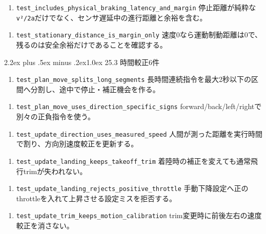 \documentclass[10pt,a4paper,openany]{ltjsbook}
\makeatletter
\renewcommand\section{\@startsection{section}{1}{0pt}%
  {2.2ex plus .5ex minus .2ex}{1.0ex}%
  {\sffamily\Large\bfseries\color{ReportNavy}}}
\makeatother
\begin{document}
\begin{enumerate}
\item \texttt{test\_includes\_physical\_braking\_latency\_and\_margin}  
停止距離が純粋な\texttt{v²/2a}だけでなく、センサ遅延中の進行距離と余裕を含む。\par
\end{enumerate}
\begin{enumerate}
\item \texttt{test\_stationary\_distance\_is\_margin\_only}  
速度0なら運動制動距離は0で、残るのは安全余裕だけであることを確認する。\par
\end{enumerate}
\section{25.3 時間較正6件}
\begin{enumerate}
\item \texttt{test\_plan\_move\_splits\_long\_segments}  
長時間連続指令を最大2秒以下の区間へ分割し、途中で停止・補正機会を作る。\par
\end{enumerate}
\begin{enumerate}
\item \texttt{test\_plan\_move\_uses\_direction\_specific\_signs}  
forward/back/left/rightで別々の正負指令を使う。\par
\end{enumerate}
\begin{enumerate}
\item \texttt{test\_update\_direction\_uses\_measured\_speed}  
人間が測った距離を実行時間で割り、方向別速度較正を更新する。\par
\end{enumerate}
\begin{enumerate}
\item \texttt{test\_update\_landing\_keeps\_takeoff\_trim}  
着陸時の補正を変えても通常飛行trimが失われない。\par
\end{enumerate}
\begin{enumerate}
\item \texttt{test\_update\_landing\_rejects\_positive\_throttle}  
手動下降設定へ正のthrottleを入れて上昇させる設定ミスを拒否する。\par
\end{enumerate}
\begin{enumerate}
\item \texttt{test\_update\_trim\_keeps\_motion\_calibration}  
trim変更時に前後左右の速度較正を消さない。\par
\end{enumerate}
\end{document}
